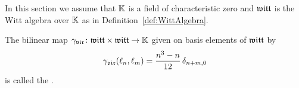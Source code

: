 In this section we assume that $\mathbb{K}$ is a field of characteristic zero
and $\mathfrak{witt}$ is the Witt algebra over $\mathbb{K}$ as in
Definition~\ref{def:WittAlgebra}.

\begin{definition}
  \label{def:VirasoroCocycle}
  \leanok
  The bilinear map ${\gamma}_{\mathfrak{vir}} \colon \mathfrak{witt} \times \mathfrak{witt} \to \mathbb{K}$
  given on basis elements of $\mathfrak{witt}$ by
  \begin{align*}
    {\gamma}_{\mathfrak{vir}}(\ell_n,\ell_m) = \frac{n^3 - n}{12} \, \delta_{n+m,0}
  \end{align*}
  is
  called the .
\end{definition}


